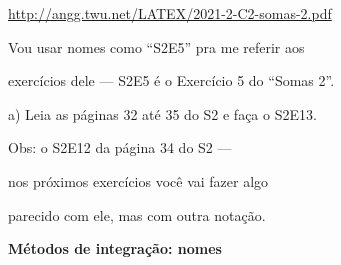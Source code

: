 \documentclass[oneside,12pt]{article}
\begin{document}
{\footnotesize

\url{http://angg.twu.net/LATEX/2021-2-C2-somas-2.pdf}

}

\ssk

Vou usar nomes como ``S2E5'' pra me referir aos

exercícios dele --- S2E5 é o Exercício 5 do ``Somas 2''.

\bsk

a) Leia as páginas 32 até 35 do S2 e faça o S2E13.

\bsk

Obs:  o S2E12 da página 34 do S2 ---

nos próximos exercícios você vai fazer algo

parecido com ele, mas com outra notação.


\newpage


{\bf Métodos de integração: nomes}
\end{document}
